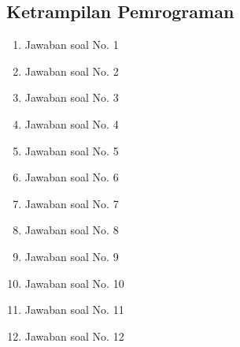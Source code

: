 \subsection{Ketrampilan Pemrograman}
\begin{enumerate}
	\item Jawaban soal No. 1
	
	
	\item Jawaban soal No. 2
	
	
	\item Jawaban soal No. 3
	
	
	\item Jawaban soal No. 4
	
	
	\item Jawaban soal No. 5
	
	
	\item Jawaban soal No. 6
	
	
	\item Jawaban soal No. 7
	
	
	\item Jawaban soal No. 8
	
	
	\item Jawaban soal No. 9
	
	
	\item Jawaban soal No. 10
	
	
	\item Jawaban soal No. 11
	
	
	\item Jawaban soal No. 12
	
	
\end{enumerate}
